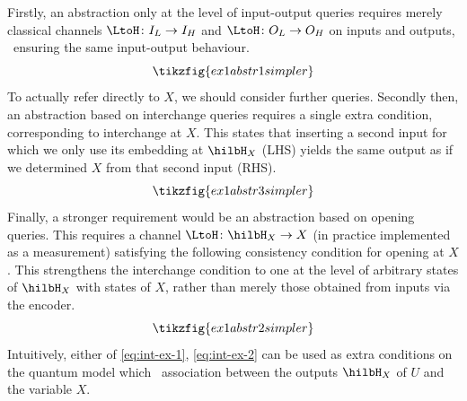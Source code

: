 \documentclass{article}
\begin{document}
\begin{example}
 Firstly, an abstraction only at the level of input-output queries requires merely classical channels $\LtoH \colon I_L \to I_H$ and $\LtoH \colon O_L \to O_H$ on inputs and outputs, \ ensuring the same input-output behaviour.  
\[
\tikzfig{ex1abstr1simpler} 
\]
To actually refer directly to $X$, we should consider further queries.  
Secondly then, an abstraction based on interchange queries requires a single extra condition, corresponding to interchange at $X$. This states that inserting a second input for which we only use its embedding at $\hilbH_X$ (LHS) yields the same output as if we determined $X$ from that second input (RHS).
\begin{equation} \label{eq:int-ex-1}
\tikzfig{ex1abstr3simpler}
\end{equation}
 Finally, a stronger requirement would be an abstraction based on opening queries. This requires a channel $\LtoH \colon \hilbH_X \to X$ (in practice implemented as a measurement) satisfying the following consistency condition for opening at $X$. This strengthens the interchange condition to one at the level of arbitrary states of $\hilbH_X$ with states of $X$, rather than merely those obtained from inputs via the encoder.  
\begin{equation} \label{eq:int-ex-2}
\tikzfig{ex1abstr2simpler}
\end{equation}
Intuitively, either of \eqref{eq:int-ex-1}, \eqref{eq:int-ex-2} can be used as extra conditions on the quantum model which \ association between the outputs $\hilbH_X$ of $U$ and the variable $X$. 

\end{example}
\end{document}
